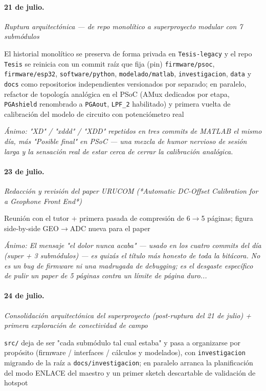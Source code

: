 \paragraph{21 de julio.}
\emph{Ruptura arquitectónica --- de repo monolítico a superproyecto modular con 7 submódulos}

El historial monolítico se preserva de forma privada en \texttt{Tesis-legacy} y el repo \texttt{Tesis} se reinicia con un commit raíz que fija (pin) \texttt{firmware/psoc}, \texttt{firmware/esp32}, \texttt{software/python}, \texttt{modelado/matlab}, \texttt{investigacion}, \texttt{data} y \texttt{docs} como repositorios independientes versionados por separado; en paralelo, refactor de topología analógica en el PSoC (AMux dedicados por etapa, \texttt{PGAshield} renombrado a \texttt{PGAout}, \texttt{LPF\_2} habilitado) y primera vuelta de calibración del modelo de circuito con potenciómetro real

{\footnotesize\itshape \'Animo: "XD" / "xddd" / "XDD" repetidos en tres commits de MATLAB el mismo día, más "Posible final" en PSoC --- una mezcla de humor nervioso de sesión larga y la sensación real de estar cerca de cerrar la calibración analógica.}

\paragraph{23 de julio.}
\emph{Redacción y revisión del paper URUCOM (*Automatic DC-Offset Calibration for a Geophone Front End*)}

Reunión con el tutor + primera pasada de compresión de 6$\rightarrow$5 páginas; figura side-by-side GEO$\rightarrow$ADC nueva para el paper

{\footnotesize\itshape \'Animo: El mensaje "el dolor nunca acaba" --- usado en los cuatro commits del día (super + 3 submódulos) --- es quizás el título más honesto de toda la bitácora. No es un bug de firmware ni una madrugada de debugging; es el desgaste específico de pulir un paper de 5 páginas contra un límite de página duro...}

\paragraph{24 de julio.}
\emph{Consolidación arquitectónica del superproyecto (post-ruptura del 21 de julio) + primera exploración de conectividad de campo}

\texttt{src/} deja de ser "cada submódulo tal cual estaba" y pasa a organizarse por propósito (firmware / interfaces / cálculos y modelados), con \texttt{investigacion} migrando de la raíz a \texttt{docs/investigacion}; en paralelo arranca la planificación del modo ENLACE del maestro y un primer sketch descartable de validación de hotspot

